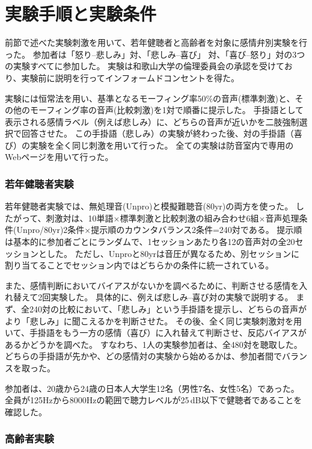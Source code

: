 \newpage
\section{実験手順と実験条件}
\label{sec:ExpCondition}
前節で述べた実験刺激を用いて、若年健聴者と高齢者を対象に感情弁別実験を行った。
参加者は「怒り--悲しみ」対、「悲しみ--喜び」 対、「喜び--怒り」対の3つの実験すべてに参加した。
実験は和歌山大学の倫理委員会の承認を受けており、実験前に説明を行ってインフォームドコンセントを得た。

実験には恒常法を用い、基準となるモーフィング率50\%の音声(標準刺激)と、その他のモーフィング率の音声(比較刺激)を1対で順番に提示した。
手掛語として表示される感情ラベル（例えば悲しみ）に、どちらの音声が近いかを二肢強制選択で回答させた。
この手掛語（悲しみ）の実験が終わった後、対の手掛語（喜び）の実験を全く同じ刺激を用いて行った。
全ての実験は防音室内で専用のWebページを用いて行った。


\subsubsection{若年健聴者実験}

若年健聴者実験では、無処理音(Unpro)と模擬難聴音(80yr)の両方を使った。
したがって、刺激対は、10単語$\times$標準刺激と比較刺激の組み合わせ6組$\times$音声処理条件(Unpro/80yr)2条件$\times$提示順のカウンタバランス2条件=240対である。
提示順は基本的に参加者ごとにランダムで、1セッションあたり各12の音声対の全20セッションとした。
ただし、Unproと80yrは音圧が異なるため、別セッションに割り当てることでセッション内ではどちらかの条件に統一されている。

また、感情判断においてバイアスがないかを調べるために、判断させる感情を入れ替えて2回実験した。
具体的に、例えば悲しみ--喜び対の実験で説明する。
まず、全240対の比較において、「悲しみ」という手掛語を提示し、どちらの音声がより「悲しみ」に聞こえるかを判断させた。
その後、全く同じ実験刺激対を用いて、手掛語をもう一方の感情（喜び）に入れ替えて判断させ、反応バイアスがあるかどうかを調べた。
すなわち、1人の実験参加者は、全480対を聴取した。
どちらの手掛語が先かや、どの感情対の実験から始めるかは、参加者間でバランスを取った。

参加者は、20歳から24歳の日本人大学生12名（男性7名、女性5名）であった。
全員が125Hzから8000Hzの範囲で聴力レベルが25\,dB以下で健聴者であることを確認した。


\subsubsection{高齢者実験}

